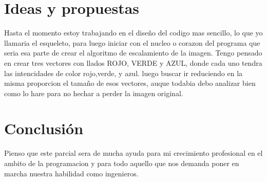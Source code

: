 \documentclass{article}
\begin{document}
\section{Ideas y propuestas}
Hasta el momento estoy trabajando en el diseño del codigo mas sencillo, lo que yo llamaria el esqueleto, para luego iniciar con el nucleo o corazon del programa que seria esa parte de crear el algoritmo de escalamiento de la imagen.
Tengo pensado en crear tres vectores con llados ROJO, VERDE y AZUL, donde cada uno tendra las intencidades de color rojo,verde, y azul. luego buscar ir reduciendo en la misma proporcion el tamaño de esos vectores, auque todabia debo analizar bien como lo hare para no hechar a perder la imagen original.

\newpage
\section{Conclusión}
Pienso que este parcial sera de mucha ayuda para mi crecimiento profesional en el ambito de la programacion y para todo aquello que nos demanda poner en marcha nuestra habilidad como ingenieros.
\end{document}
